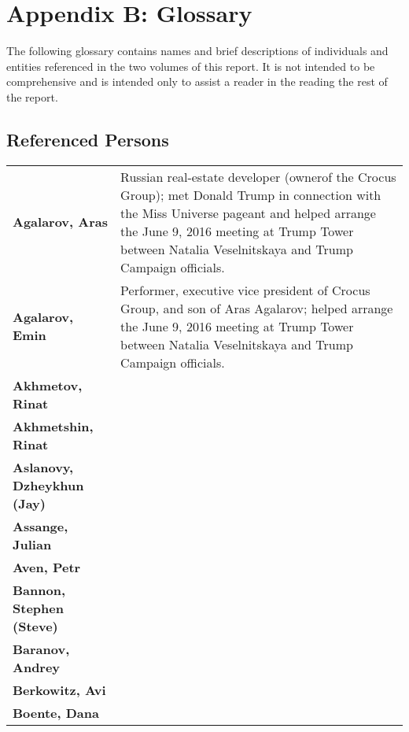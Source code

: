 \section{Appendix B: Glossary}

The following glossary contains names and brief descriptions of individuals and entities referenced in the two volumes of this report.
It is not intended to be comprehensive and is intended only to assist a reader in the reading the rest of the report.

\subsection{Referenced Persons}

\begin{tabu} to \textwidth {XX[3]}

    \textbf{Agalarov, Aras} & Russian real-estate developer (ownerof the Crocus Group); met Donald Trump in connection with the Miss Universe pageant and helped arrange the June 9, 2016 meeting at Trump Tower between Natalia Veselnitskaya and Trump Campaign officials. \\

    \textbf{Agalarov, Emin} & Performer, executive vice president of Crocus Group, and son of Aras Agalarov; helped arrange the June 9, 2016 meeting at Trump Tower between Natalia Veselnitskaya and Trump Campaign officials. \\

    \textbf{Akhmetov, Rinat} &  \\

    \textbf{Akhmetshin, Rinat} &  \\

    \textbf{Aslanovy, Dzheykhun (Jay)} &  \\

    \textbf{Assange, Julian} &  \\

    \textbf{Aven, Petr} &  \\

    \textbf{Bannon, Stephen (Steve)} &  \\

    \textbf{Baranov, Andrey} &  \\

    \textbf{Berkowitz, Avi} &  \\

    \textbf{Boente, Dana} &  \\


\end{tabu}
